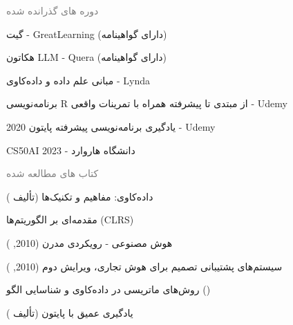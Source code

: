 \documentclass[a4paper]{deedy-persian} %
\begin{document}
\begin{minipage}[t]{0.62\textwidth}
\begin{tightitemize}
\end{tightitemize}
\sectionspace %
\vspace{\topsep}
\textcolor{gray}{\huge {دوره های گذرانده شده}}
\vspace{\itemsep} %
\begin{tightitemize}
\item گیت - GreatLearning (دارای گواهینامه)
\item هکاتون LLM - Quera (دارای گواهینامه)
\item مبانی علم داده و داده‌کاوی - Lynda
\item برنامه‌نویسی R از مبتدی تا پیشرفته همراه با تمرینات واقعی - Udemy
\item یادگیری برنامه‌نویسی پیشرفته پایتون 2020 - Udemy
\item CS50AI 2023 - دانشگاه هاروارد
\end{tightitemize}
\sectionspace %
\vspace{\topsep}
\textcolor{gray}{\huge {کتاب های مطالعه شده}}
\vspace{\itemsep} %
\begin{tightitemize}
\item داده‌کاوی: مفاهیم و تکنیک‌ها (تألیف )
\item مقدمه‌ای بر الگوریتم‌ها (CLRS)
\item هوش مصنوعی - رویکردی مدرن (2010, )
\item سیستم‌های پشتیبانی تصمیم برای هوش تجاری، ویرایش دوم (2010, )
\item روش‌های ماتریسی در داده‌کاوی و شناسایی الگو ()
\item یادگیری عمیق با پایتون (تألیف )
\end{tightitemize}
\vspace{\topsep} 


\end{minipage} %
\hfill
\end{document}
